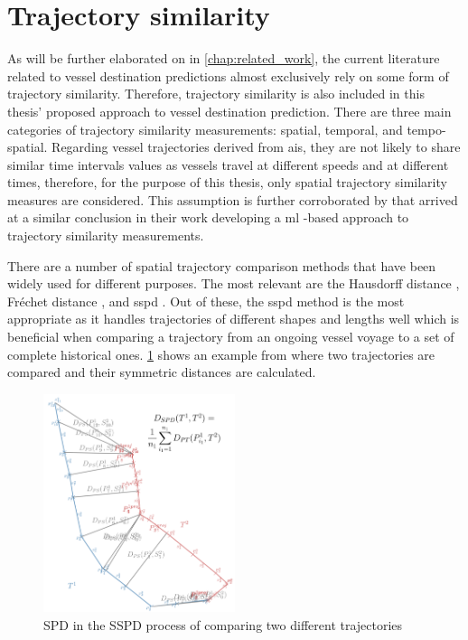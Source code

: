 \section{Trajectory similarity}

As will be further elaborated on in \cref{chap:related_work}, the current literature related to vessel destination predictions almost exclusively rely on some form of trajectory similarity. Therefore, trajectory similarity is also included in this thesis' proposed approach to vessel destination prediction. There are three main categories of trajectory similarity measurements: spatial, temporal, and tempo-spatial. Regarding vessel trajectories derived from \acrshort{ais}, they are not likely to share similar time intervals values as vessels travel at different speeds and at different times, therefore, for the purpose of this thesis, only spatial trajectory similarity measures are considered. This assumption is further corroborated by \cite{Zhang2020AISApproach} that arrived at a similar conclusion in their work developing a \acrfull{ml} -based approach to trajectory similarity measurements.

There are a number of spatial trajectory comparison methods that have been widely used for different purposes. The most relevant are the Hausdorff distance \parencite{magdy2015}, Fréchet distance \parencite{magdy2015}, and \acrfull{sspd} \parencite{besse2015review}. Out of these, the \acrshort{sspd} method is the most appropriate as it handles trajectories of different shapes and lengths well which is beneficial when comparing a trajectory from an ongoing vessel voyage to a set of complete historical ones. \cref{fig:sspd} shows an example from \cite{besse2015review} where two trajectories are compared and their symmetric distances are calculated.

\begin{figure}[htbp]  %
    \centering
    \includegraphics[width=0.5\textwidth]{figures/sspd}
    \caption{SPD in the SSPD process of comparing two different trajectories \parencite{besse2015review}}
    \label{fig:sspd}
\end{figure}

